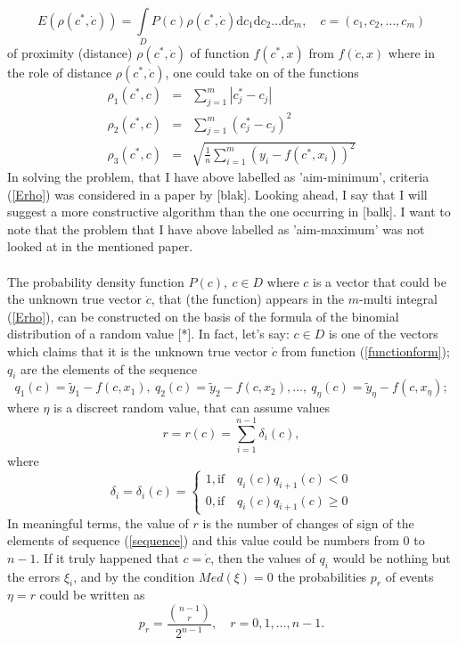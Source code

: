\documentclass[11pt]{article}
\numberwithin{equation}{subsection}
\begin{document}
\begin{equation}
E(\rho(c^{*},\dot{c}))= \int\limits_{D}P(c)\rho(c^{*},\dot{c})\mathrm{d}c_{1}\mathrm{d}c_{2}\dots \mathrm{d}c_{m}, \quad c = (c_{1},c_{2},\dots,c_{m}) \label{Erho}
\end{equation}
of proximity (distance) $\rho(c^{*},\dot{c})$ of function $f(c^{*},x)$ from $f(\dot{c},x)$ where in the role of distance $\rho(c^{*},\dot{c})$, one could take on of the functions
\begin{eqnarray}
\rho_{1}(c^{*},c) &=& \sum\limits_{j=1}^{m} \left| c_{j}^{*}-c_{j} \right| \label{rho1}\\
\rho_{2}(c^{*},c) &=& \sum\limits_{j=1}^{m} \left( c_{j}^{*}-c_{j} \right)^{2} \label{rho2}\\
\rho_{3}(c^{*},c) &=& \sqrt{\frac{1}{n}\sum\limits_{i=1}^{m} \left( y_{i}-f(c^{*},x_{i}) \right)^{2}} \label{rho3}
\end{eqnarray}
In solving the problem, that I have above labelled as 'aim-minimum', criteria (\ref{Erho}) was considered in a paper by [blak]. Looking ahead, I say that I will suggest a more constructive algorithm than the one occurring in [balk]. I want to note that the problem that I have above labelled as 'aim-maximum' was not looked at in the mentioned paper. \\
\\
The probability density function $P(c),\  c \in D$ where $c$ is a vector that could be the unknown true vector $\dot{c}$, that (the function) appears in the $m$-multi integral (\ref{Erho}), can be constructed on the basis of the formula of the binomial distribution of a random value [*]. In fact, let's say: $c \in D$ is one of the vectors which claims that it is the unknown true vector $ \dot{c}$ from function (\ref{functionform}); $q_{i}$ are the elements of the sequence
\begin{equation}
q_{1}(c)=\tilde{y}_{1}-f(c,x_{1}),\ q_{2}(c)=\tilde{y}_{2}-f(c,x_{2}), \dots, \ q_{\eta}(c)=\tilde{y}_{\eta}-f(c,x_{\eta}); \label{sequence}
\end{equation}
where $\eta$ is a discreet random value, that can assume values
\begin{equation}
r=r(c)=\sum\limits_{i=1}^{n-1} \delta_{i}(c),
\end{equation}
where
\begin{equation}
\delta_{i}=\delta_{i}(c)=
\begin{cases} 
      1, \mathrm{if} \quad q_{i}(c)q_{i+1}(c)<0\\
      0, \mathrm{if} \quad q_{i}(c)q_{i+1}(c)\geq 0
   \end{cases}
\end{equation}
In meaningful terms, the value of $r$ is the number of changes of sign of the elements of sequence (\ref{sequence}) and this value could be numbers from 0 to $n-1$. If it truly happened that $c=\dot{c}$, then the values of $q_{i}$ would be nothing but the errors $\xi_{i}$, and by the condition $Med(\xi)=0$ the probabilities $p_{r}$ of events $\eta = r$ could be written as
\begin{equation}
p_{r}= \frac{\binom {n-1}r}{2^{n-1}}, \quad r = 0,1,\dots,n-1.
\end{equation}
\end{document}
